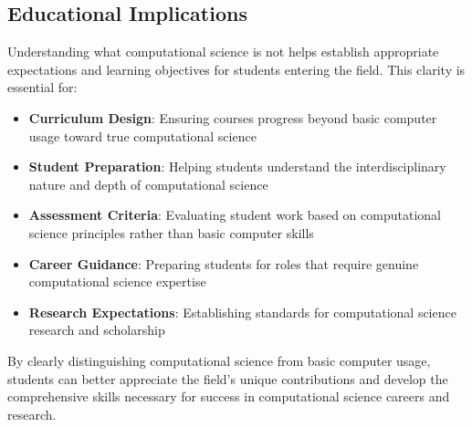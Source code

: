 \subsection{Educational Implications}

Understanding what computational science is not helps establish appropriate expectations and learning objectives for students entering the field. This clarity is essential for:

\begin{itemize}
    \item \textbf{Curriculum Design}: Ensuring courses progress beyond basic computer usage toward true computational science
    \item \textbf{Student Preparation}: Helping students understand the interdisciplinary nature and depth of computational science
    \item \textbf{Assessment Criteria}: Evaluating student work based on computational science principles rather than basic computer skills
    \item \textbf{Career Guidance}: Preparing students for roles that require genuine computational science expertise
    \item \textbf{Research Expectations}: Establishing standards for computational science research and scholarship
\end{itemize}

By clearly distinguishing computational science from basic computer usage, students can better appreciate the field's unique contributions and develop the comprehensive skills necessary for success in computational science careers and research.


